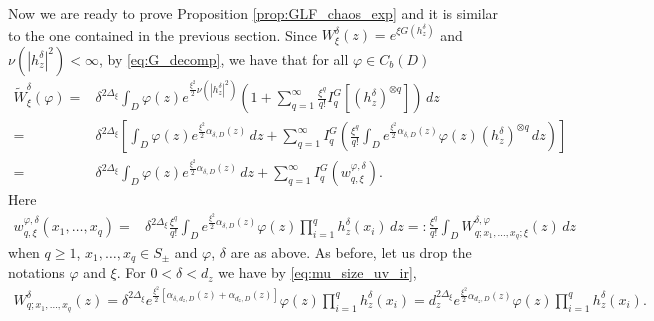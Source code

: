 \documentclass[a4paper, 11pt, reqno]{amsart}
\theoremstyle{definition} \newtheorem{defn}{Definition}[section]
\theoremstyle{remark} \newtheorem{rem}[defn]{Remark}
\theoremstyle{remark} \newtheorem*{rem*}{Remark}
\theoremstyle{plain} \newtheorem{thm}[defn]{Theorem}
\theoremstyle{plain} \newtheorem{lem}[defn]{Lemma}
\theoremstyle{plain} \newtheorem{prop}[defn]{Proposition}
\theoremstyle{plain} \newtheorem{cor}[defn]{Corollary}
\theoremstyle{remark} \newtheorem{exm}[defn]{\textbf{Example}}
\theoremstyle{remark} \newtheorem{exms}[defn]{\textbf{Examples}}
\theoremstyle{remark} \newtheorem*{bl}{}
\numberwithin{equation}{section} %
\begin{document}
    Now we are ready to prove Proposition \ref{prop:GLF_chaos_exp} and it is similar to the one contained in the previous section. Since $W^{\delta}_{\xi}(z) = e^{\xi G(h^{\delta}_z)}$ and $\nu(|h^{\delta}_z|^2) < \infty$, by \eqref{eq:G_decomp}, we have that for all $\varphi \in C_b (D)$
		\begin{align}\label{eq:W_decomp_1}
			\tilde{W}^{\delta}_{\xi}(\varphi)  
			= & \delta^{2\Delta_{\xi}} \int_D \varphi(z) e^{\frac{\xi^2}{2} \nu(|h^{\delta}_z|^2)} \left(1+ \sum_{q=1}^{\infty} \frac{\xi^q}{q!} I^G_q[(h^{\delta}_z)^{\otimes q}]\right) \, dz
			\nonumber \\
			= & \delta^{2\Delta_{\xi}} \left[\int_D \varphi(z) e^{\frac{\xi^2}{2} \alpha_{\delta, D}(z)} \, dz 
			+ \sum_{q=1}^{\infty} I^G_q\left(\frac{\xi^q}{q!}  \int_D e^{\frac{\xi^2}{2} \alpha_{\delta, D}(z)}  \varphi(z) (h^{\delta}_z)^{\otimes q} \, dz\right)\right]
			\nonumber \\
			= & \delta^{2\Delta_{\xi}} \int_D \varphi(z) e^{\frac{\xi^2}{2} \alpha_{\delta, D}(z)} \, dz 
			+ \sum_{q=1}^{\infty} I^G_q\left(w^{\varphi, \delta}_{q, \xi}\right).
		\end{align}
		Here 
		\begin{align}\label{eq:W_decomp_2}
			w^{\varphi, \delta}_{q, \xi}(x_1, \ldots, x_q) = & \delta^{2\Delta_{\xi}}  \frac{\xi^q}{q!}  \int_D e^{\frac{\xi^2}{2} \alpha_{\delta, D}(z)}  \varphi(z) \prod_{i=1}^q h^{\delta}_z (x_i)  \, dz
			=:  \frac{\xi^q}{q!}  \int_D W^{\delta, \varphi}_{q;x_1,\ldots, x_q; \xi}(z)\, dz
		\end{align}		
		when $q\ge 1$, $x_1, \ldots, x_q \in S_{\pm}$ and $\varphi$, $\delta$ are as above. As before, let us drop the notations $\varphi$ and $\xi$. For $0<\delta<d_z$ we have by \eqref{eq:mu_size_uv_ir},
		\begin{align}\label{eq:W_decomp_3}
			W^{\delta}_{q;x_1,\ldots, x_q}(z) 
			=  \delta^{2\Delta_{\xi}}  e^{\frac{\xi^2}{2} [\alpha_{\delta, d_z, D}(z) + \alpha_{ d_z, D}(z)]}  \varphi(z) \prod_{i=1}^q h^{\delta}_z(x_i)
			=  d_z^{2\Delta_{\xi}} e^{\frac{\xi^2}{2} \alpha_{ d_z, D}(z)}  \varphi(z) \prod_{i=1}^q h^{\delta}_z(x_i).
		\end{align}
\end{document}
